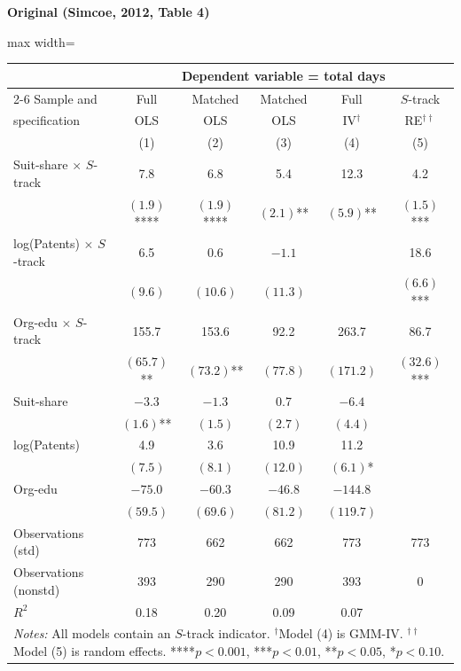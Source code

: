 \documentclass[11pt,a4paper]{article}
\begin{document}
\vspace{0.5cm}
\begin{minipage}[t]{0.48\textwidth}
\centering
\textbf{\large Original (Simcoe, 2012, Table 4)}
\vspace{0.3cm}

\begin{adjustbox}{max width=\textwidth}
\begin{tabular}{lccccc}
\toprule
 & \multicolumn{5}{c}{Dependent variable = total days} \\
\cmidrule(lr){2-6}
Sample and & Full & Matched & Matched & Full & $S$-track \\
specification & OLS & OLS & OLS & IV$^\dagger$ & RE$^{\dagger\dagger}$ \\
 & (1) & (2) & (3) & (4) & (5) \\
\midrule
Suit-share $\times$ $S$-track & 7.8 & 6.8 & 5.4 & 12.3 & 4.2 \\
 & $(1.9)$**** & $(1.9)$**** & $(2.1)$** & $(5.9)$** & $(1.5)$*** \\[0.3em]
log(Patents) $\times$ $S$-track & 6.5 & 0.6 & $-1.1$ &  & 18.6 \\
 & $(9.6)$ & $(10.6)$ & $(11.3)$ &  & $(6.6)$*** \\[0.3em]
Org-edu $\times$ $S$-track & 155.7 & 153.6 & 92.2 & 263.7 & 86.7 \\
 & $(65.7)$** & $(73.2)$** & $(77.8)$ & $(171.2)$ & $(32.6)$*** \\[0.3em]
Suit-share & $-3.3$ & $-1.3$ & 0.7 & $-6.4$ &  \\
 & $(1.6)$** & $(1.5)$ & $(2.7)$ & $(4.4)$ &  \\[0.3em]
log(Patents) & 4.9 & 3.6 & 10.9 & 11.2 &  \\
 & $(7.5)$ & $(8.1)$ & $(12.0)$ & $(6.1)$* &  \\[0.3em]
Org-edu & $-75.0$ & $-60.3$ & $-46.8$ & $-144.8$ &  \\
 & $(59.5)$ & $(69.6)$ & $(81.2)$ & $(119.7)$ &  \\[0.3em]
\midrule
Observations (std) & 773 & 662 & 662 & 773 & 773 \\
Observations (nonstd) & 393 & 290 & 290 & 393 & 0 \\
$R^2$ & 0.18 & 0.20 & 0.09 & 0.07 &  \\
\bottomrule
\multicolumn{6}{p{0.95\textwidth}}{\footnotesize\textit{Notes:} All models contain an $S$-track indicator. $^\dagger$Model (4) is GMM-IV. $^{\dagger\dagger}$Model (5) is random effects. ****$p<0.001$, ***$p<0.01$, **$p<0.05$, *$p<0.10$.}
\end{tabular}
\end{adjustbox}
\end{minipage}%
\end{document}
